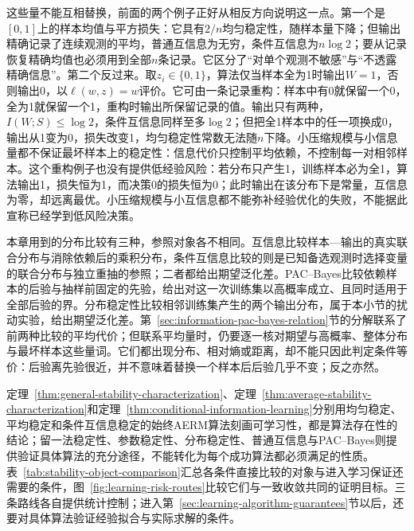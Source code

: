 这些量不能互相替换，前面的两个例子正好从相反方向说明这一点。第一个是$[0,1]$上的样本均值与平方损失：它具有$2/n$均匀稳定性，随样本量下降；但输出精确记录了连续观测的平均，普通互信息为无穷，条件互信息为$n\log2$；要从记录恢复精确均值也必须用到全部$n$条记录。它区分了“对单个观测不敏感”与“不透露精确信息”。第二个反过来。取$z_i\in\{0,1\}$，算法仅当样本全为1时输出$W=1$，否则输出0，以$\ell(w,z)=w$评价。它可由一条记录重构：样本中有0就保留一个0，全为1就保留一个1，重构时输出所保留记录的值。输出只有两种，$I(W;S)\leq\log2$，条件互信息同样至多$\log2$；但把全1样本中的任一项换成0，输出从1变为0，损失改变1，均匀稳定性常数无法随$n$下降。小压缩规模与小信息量都不保证最坏样本上的稳定性：信息代价只控制平均依赖，不控制每一对相邻样本。这个重构例子也没有提供低经验风险：若分布只产生1，训练样本必为全1，算法输出1，损失恒为1，而决策0的损失恒为0；此时输出在该分布下是常量，互信息为零，却远离最优。小压缩规模与小互信息都不能弥补经验优化的失败，不能据此宣称已经学到低风险决策。

本章用到的分布比较有三种，参照对象各不相同。互信息比较样本—输出的真实联合分布与消除依赖后的乘积分布，条件互信息比较的则是已知备选观测时选择变量的联合分布与独立重抽的参照；二者都给出期望泛化差。PAC--Bayes比较依赖样本的后验与抽样前固定的先验，给出对这一次训练集以高概率成立、且同时适用于全部后验的界。分布稳定性比较相邻训练集产生的两个输出分布，属于本小节的扰动实验，给出期望泛化差。第~\ref{sec:information-pac-bayes-relation}节的分解联系了前两种比较的平均代价；但联系平均量时，仍要逐一核对期望与高概率、整体分布与最坏样本这些量词。它们都出现分布、相对熵或距离，却不能只因此判定条件等价：后验离先验很近，并不意味着替换一个样本后后验几乎不变；反之亦然。

定理~\ref{thm:general-stability-characterization}、定理~\ref{thm:average-stability-characterization}和定理~\ref{thm:conditional-information-learning}分别用均匀稳定、平均稳定和条件互信息稳定的始终AERM算法刻画可学习性，都是算法存在性的结论；留一法稳定性、参数稳定性、分布稳定性、普通互信息与PAC--Bayes则提供验证具体算法的充分途径，不能转化为每个成功算法都必须满足的性质。表~\ref{tab:stability-object-comparison}汇总各条件直接比较的对象与进入学习保证还需要的条件，图~\ref{fig:learning-risk-routes}比较它们与一致收敛共同的证明目标。三条路线各自提供统计控制；进入第~\ref{sec:learning-algorithm-guarantees}节以后，还要对具体算法验证经验拟合与实际求解的条件。

